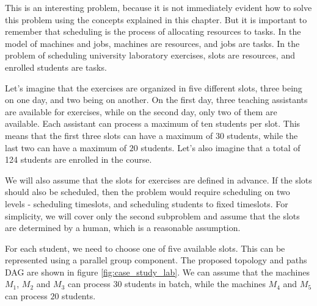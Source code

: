 This is an interesting problem, because it is not immediately evident how to solve this problem using the concepts explained in this chapter. But it is important to remember that scheduling is the process of allocating resources to tasks. In the model of machines and jobs, machines are resources, and jobs are tasks. In the problem of scheduling university laboratory exercises, slots are resources, and enrolled students are tasks.

Let's imagine that the exercises are organized in five different slots, three being on one day, and two being on another. On the first day, three teaching assistants are available for exercises, while on the second day, only two of them are available. Each assistant can process a maximum of ten students per slot. This means that the first three slots can have a maximum of $30$ students, while the last two can have a maximum of $20$ students. Let's also imagine that a total of 124 students are enrolled in the course.

We will also assume that the slots for exercises are defined in advance. If the slots should also be scheduled, then the problem would require scheduling on two levels - scheduling timeslots, and scheduling students to fixed timeslots. For simplicity, we will cover only the second subproblem and assume that the slots are determined by a human, which is a reasonable assumption.

For each student, we need to choose one of five available slots. This can be represented using a parallel group component. The proposed topology and paths DAG are shown in figure \ref{fig:case_study_lab}. We can assume that the machines $M_1$, $M_2$ and $M_3$ can process $30$ students in batch, while the machines $M_4$ and $M_5$ can process $20$ students.

